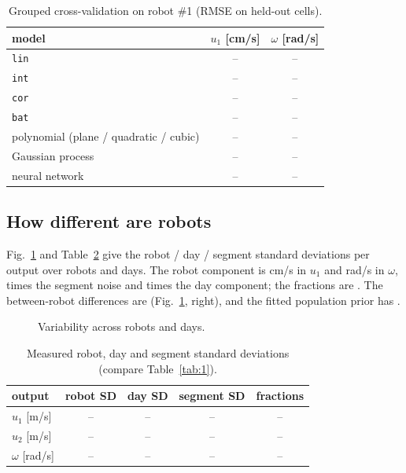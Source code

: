 \begin{table}[t]
\caption{Grouped cross-validation on robot \#1 (RMSE on held-out cells). }
\label{tab:hw-cv}
\centering\footnotesize
\begin{tabular}{lcc}
\toprule
model & \(u_1\) [cm/s] & \(\omega\) [rad/s] \\
\midrule
\texttt{lin} & -- & -- \\
\texttt{int} & -- & -- \\
\texttt{cor} & -- & -- \\
\texttt{bat} & -- & -- \\
polynomial (plane / quadratic / cubic) & -- & -- \\
Gaussian process & -- & -- \\
neural network & -- & -- \\
\bottomrule
\end{tabular}
\end{table}

\subsection{How different are  robots}\label{sec:hw-variability}

Fig.~\ref{fig:variance} and Table~\ref{tab:hw-variance} give the robot
/ day / segment standard deviations per output over  robots and
 days. The robot component is  cm/s in \(u_1\) and 
rad/s in \(\omega\),  times the segment noise and  times
the day component; the fractions are . The
between-robot differences are  (Fig.~\ref{fig:variance}, right), and the
fitted population prior has .

\begin{figure}[t]
\centering
{}
\caption{Variability across  robots and  days. }
\label{fig:variance}
\end{figure}

\begin{table}[t]
\caption{Measured robot, day and segment standard deviations (compare Table~\ref{tab:1}). }
\label{tab:hw-variance}
\centering\footnotesize
\begin{tabular}{lcccc}
\toprule
output & robot SD & day SD & segment SD & fractions \\
\midrule
\(u_1\) [m/s] & -- & -- & -- & -- \\
\(u_2\) [m/s] & -- & -- & -- & -- \\
\(\omega\) [rad/s] & -- & -- & -- & -- \\
\bottomrule
\end{tabular}
\end{table}

